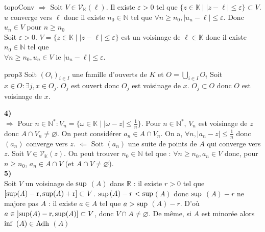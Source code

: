 \documentclass[12pt,a4paper]{report}
\begin{document}
\begin{demonstration}{topoConv}
$\Longrightarrow$ Soit $V \in \mathcal{V}_\mathbb{K}(\ell)$. Il existe $\varepsilon > 0$ tel que $\{z \in \mathbb{K} \mid \lvert z-\ell \rvert \leq \varepsilon \} \subset V$.
\newline $u$ converge vers $\ell$ donc il existe $n_0 \in \mathbb{N}$ tel que $\forall n \geq n_0, \lvert u_n - \ell \rvert \leq \varepsilon$. Donc $u_n \in V$ pour $n \geq n_0$ \\
Soit $\varepsilon > 0$. $V = \{z \in \mathbb{K} \mid \lvert z-\ell \rvert \leq \varepsilon \}$ est un voisinage de $\ell \in \mathbb{K}$ donc il existe $n_0 \in \mathbb{N}$ tel que \\
$\forall n\geq n_0, u_n \in V$ ie $\lvert u_n - \ell \rvert \leq \varepsilon$.
\end{demonstration}

\begin{demonstration}{prop3}
Soit $(O_i)_{i \in I}$ une famille d'ouverts de $K$ et $O = \displaystyle{\bigcup_{i \in I}} O_i$
\newline Soit $x \in O : \exists j, x \in O_j$. $O_j$ est ouvert donc $O_j$ est voisinage de $x$. $O_j \subset O$ donc $O$ est voisinage de $x$.
\end{demonstration}

\begin{demonstration}{}
\textbf{4)}\\
$\Longrightarrow$ Pour $n \in \mathbb{N}^* : V_n = \{ \omega \in \mathbb{K} \mid \lvert \omega-z \rvert \leq \frac{1}{n} \}$. Pour $n \in \mathbb{N}^*$, $V_n$ est voisinage de $z$ donc $A \cap V_n \neq \varnothing$.
\newline On peut considérer $a_n \in A \cap V_n$. On a, $\forall n, \lvert a_n - z \rvert \leq \frac{1}{n}$ donc $(a_n)$ converge vers $z$.
\newline $\Longleftarrow$ Soit $(a_n)$ une suite de points de $A$ qui converge vers $z$. Soit $V \in \mathcal{V}_{\mathbb{K}}(z)$. On peut trouver $n_0 \in \mathbb{N}$ tel que : $\forall n \geq n_0, a_n \in V$ donc, pour $n \geq n_0$, $a_n \in A \cap V$ (et $A \cap V \neq \varnothing$).\\

\textbf{5)}\\
\newline Soit $V$ un voisinage de $\rm{sup}$ $(A)$ dans $\mathbb{R}$ : il existe $r>0$ tel que $\left[\rm{sup}(\emph{A}) - r, \rm{sup}(\emph{A})+r\right] \subset V$.
\newline $\rm{sup}$$(A) -r < \rm{sup}$$(A)$ donc $\rm{sup}$ $(A)-r$ ne majore pas $A$ : il existe $a \in A$ tel que $a > \rm{sup}$ $(A)-r$.
\newline D'où $a \in \left]\rm{sup}(\emph{A})-r, \rm{sup}(\emph{A}) \right] \subset V$, donc $V \cap A \neq \varnothing$.
\newline De même, si $A$ est minorée alors $\rm{inf}$ $(A) \in \rm{Adh}$ $(A)$
\end{demonstration}
\end{document}

